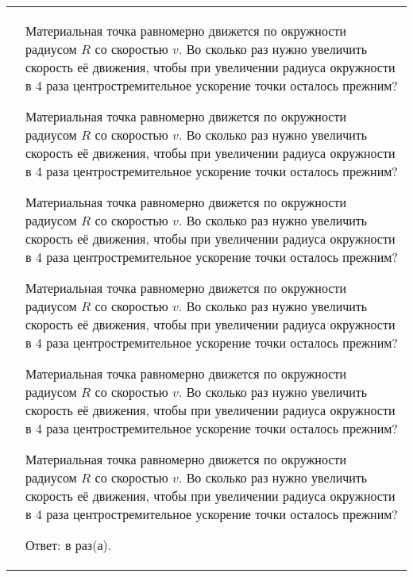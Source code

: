 \documentclass[10pt,a4paper,twocolumn,landscape]{article}
\newcommand{\createtask}[2]{
	\hspace{-1.3cm}
	\begin{tabular}{c l}
		\framebox[0.85cm]{\textbf{#1}}\hspace{-0.15cm} &
		\begin{minipage}[t]{11.25cm}
			#2
		\end{minipage}
	\end{tabular}
	\phantom{1}
}
\newcommand{\blankanswer}{ \underline{\hspace{4.5cm}} }
\newcommand{\separ}{\vspace{1em}}
\newcommand{\sepline}{\vspace{1em}}
\begin{document}
\createtask{21}{
	Материальная точка равномерно движется по окружности радиусом $R$
	со скоростью $v$. Во сколько раз нужно увеличить скорость её движения,
	чтобы при увеличении радиуса окружности в 4 раза центростремительное
	ускорение точки осталось прежним?

	Материальная точка равномерно движется по окружности радиусом $R$
	со скоростью $v$. Во сколько раз нужно увеличить скорость её движения,
	чтобы при увеличении радиуса окружности в 4 раза центростремительное
	ускорение точки осталось прежним?

	Материальная точка равномерно движется по окружности радиусом $R$
	со скоростью $v$. Во сколько раз нужно увеличить скорость её движения,
	чтобы при увеличении радиуса окружности в 4 раза центростремительное
	ускорение точки осталось прежним?

	Материальная точка равномерно движется по окружности радиусом $R$
	со скоростью $v$. Во сколько раз нужно увеличить скорость её движения,
	чтобы при увеличении радиуса окружности в 4 раза центростремительное
	ускорение точки осталось прежним?

	Материальная точка равномерно движется по окружности радиусом $R$
	со скоростью $v$. Во сколько раз нужно увеличить скорость её движения,
	чтобы при увеличении радиуса окружности в 4 раза центростремительное
	ускорение точки осталось прежним?
	
	Материальная точка равномерно движется по окружности радиусом $R$
	со скоростью $v$. Во сколько раз нужно увеличить скорость её движения,
	чтобы при увеличении радиуса окружности в 4 раза центростремительное
	ускорение точки осталось прежним?

	\sepline
	Ответ: в \blankanswer раз(а).
}
\separ
\end{document}
